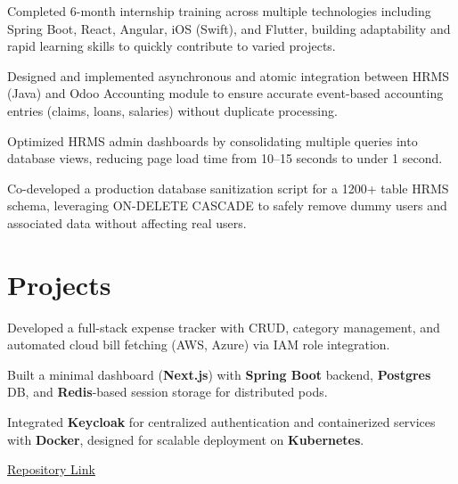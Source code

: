 \documentclass[]{deedy-resume-reversed}
\begin{document}
\begin{minipage}[t]{0.60\textwidth}
\begin{tightemize}
\item Completed 6-month internship training across multiple technologies including Spring Boot, React, Angular, iOS (Swift), and Flutter, building adaptability and rapid learning skills to quickly contribute to varied projects.
\item Designed and implemented asynchronous and atomic integration between HRMS (Java) and Odoo Accounting module to ensure accurate event-based accounting entries (claims, loans, salaries) without duplicate processing.
\item Optimized HRMS admin dashboards by consolidating multiple queries into database views, reducing page load time from 10–15 seconds to under 1 second.
\item Co-developed a production database sanitization script for a 1200+ table HRMS schema, leveraging ON-DELETE CASCADE to safely remove dummy users and associated data without affecting real users.
\end{tightemize}
\sectionsep




\section{Projects}
\begin{tightemize}
\item Developed a full-stack expense tracker with CRUD, category management, and automated cloud bill fetching (AWS, Azure) via IAM role integration.
\item Built a minimal dashboard (\textbf{Next.js}) with \textbf{Spring Boot} backend, \textbf{Postgres} DB, and \textbf{Redis}-based session storage for distributed pods.
\item Integrated \textbf{Keycloak} for centralized authentication and containerized services with \textbf{Docker}, designed for scalable deployment on \textbf{Kubernetes}.
\item \href{https://github.com/JayBhensdadia/munimjii}{Repository Link}
\end{tightemize}
\sectionsep





\end{minipage}
\end{document}
